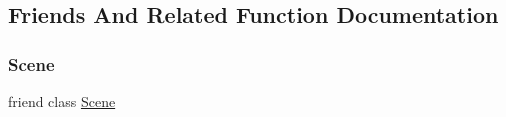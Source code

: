 \subsection{Friends And Related Function Documentation}
\hypertarget{classmage_1_1_node_client_a032858ae1fe02d2d1170981c2af2d67c}{}\label{classmage_1_1_node_client_a032858ae1fe02d2d1170981c2af2d67c} 
\subsubsection{\texorpdfstring{Scene}{Scene}}
{\footnotesize\ttfamily friend class \hyperlink{classmage_1_1_scene}{Scene}\hspace{0.3cm}{\ttfamily [friend]}}

